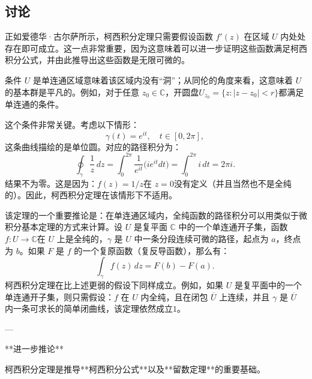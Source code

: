 \subsection{讨论}
正如爱德华·古尔萨所示，柯西积分定理只需要假设函数 $f'(z)$ 在区域 $U$ 内处处存在即可成立。这一点非常重要，因为这意味着可以进一步证明这些函数满足柯西积分公式，并由此推导出这些函数是无限可微的。

条件 $U$ 是单连通区域意味着该区域内没有“洞”；从同伦的角度来看，这意味着 $U$ 的基本群是平凡的。例如，对于任意 $z_0 \in \mathbb{C}$，开圆盘$U_{z_0} = \{z : |z - z_0| < r \}$都满足单连通的条件。

这个条件非常关键。考虑以下情形：
$$
\gamma(t) = e^{it}, \quad t \in [0, 2\pi],~
$$
这条曲线描绘的是单位圆。对应的路径积分为：
$$
\oint_{\gamma} \frac{1}{z}\,dz
= \int_0^{2\pi} \frac{1}{e^{it}} \big(i e^{it} dt\big)
= \int_0^{2\pi} i\, dt
= 2\pi i.~
$$
结果不为零。这是因为：$f(z) = 1/z$在 $z = 0$没有定义（并且当然也不是全纯的）。因此，柯西积分定理在该情形下不适用。

该定理的一个重要推论是：在单连通区域内，全纯函数的路径积分可以用类似于微积分基本定理的方式来计算。设 $U$ 是复平面 $\mathbb{C}$ 中的一个单连通开子集，函数$f: U \to \mathbb{C}$在 $U$ 上是全纯的，$\gamma$ 是 $U$ 中一条分段连续可微的路径，起点为 $a$，终点为 $b$。如果 $F$ 是 $f$ 的一个复原函数（复反导函数），那么有：
$$
\int_{\gamma} f(z)\,dz = F(b) - F(a).~
$$
柯西积分定理在比上述更弱的假设下同样成立。例如，如果 $U$ 是复平面中的一个单连通开子集，则只需假设：$f$ 在 $U$ 内全纯，且在闭包 $\overline{U}$ 上连续，并且 $\gamma$ 是 $\overline{U}$ 内一条可求长的简单闭曲线，该定理依然成立$1$。

---

**进一步推论**

柯西积分定理是推导**柯西积分公式**以及**留数定理**的重要基础。
